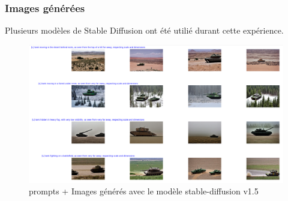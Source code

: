 \subsubsection{Images générées}

Plusieurs modèles de Stable Diffusion ont été utilié durant cette expérience.

\begin{figure}[H]
    \center
    \includegraphics[width=\textwidth]{./images/v1-5_sd_dreambooth.png}
    \caption{prompts + Images générés avec le modèle stable-diffusion v1.5}
    \label{fig:image_sdv15}
\end{figure}


